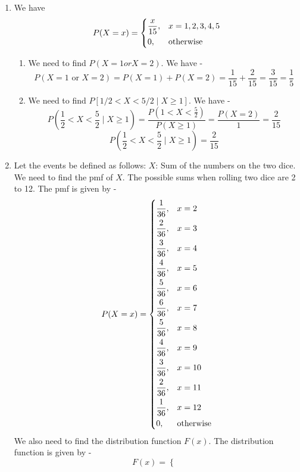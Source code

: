 \begin{enumerate}
\begin{enumerate}
\[\begin{cases}
            \end{cases}
            \]
            where $k = \frac{-4 + \sqrt{26}}{10}$.
    \end{enumerate}
    \item We have $$P(X = x) = \begin{dcases}
        \frac{x}{15}, & x = 1, 2, 3, 4, 5 \\
        0, & \text{otherwise}
    \end{dcases}
    $$
    \begin{enumerate}
        \item We need to find $P(X = 1 or X=2)$. We have -
        \[\boxed{P(X = 1 \text{ or } X=2) = P(X=1) + P(X=2) = \frac{1}{15} + \frac{2}{15} = \frac{3}{15} = \frac{1}{5}
        }\]
        \item We need to find $P[1/2 < X < 5/2 \mid X \geq 1]$. We have -
        \[P\left(\frac{1}{2} < X < \frac{5}{2} \mid X \geq 1\right) = \frac{P\left(1 < X < \frac{5}{2}\right)}{P(X \geq 1)} = \frac{P(X=2)}{1} = \frac{2}{15}\]
        \[\boxed{P\left(\frac{1}{2} < X < \frac{5}{2} \mid X \geq 1\right) = \frac{2}{15}
        }\]
    \end{enumerate}
    \item Let the events be defined as follows:
    $X$: Sum of the numbers on the two dice. We need to find the pmf of $X$. The possible sums when rolling two dice are 2 to 12. The pmf is given by -
    $$P(X = x) = \begin{dcases}
        \frac{1}{36}, & x = 2 \\
        \frac{2}{36}, & x = 3 \\
        \frac{3}{36}, & x = 4 \\
        \frac{4}{36}, & x = 5 \\
        \frac{5}{36}, & x = 6 \\
        \frac{6}{36}, & x = 7 \\
        \frac{5}{36}, & x = 8 \\
        \frac{4}{36}, & x = 9 \\
        \frac{3}{36}, & x = 10 \\
        \frac{2}{36}, & x = 11 \\
        \frac{1}{36}, & x = 12 \\
        0, & \text{otherwise}
    \end{dcases}
    $$
    We also need to find the distribution function $F(x)$. The distribution function is given by -
    \[F(x) = 
    \begin{cases}

\end{cases}\]
\end{enumerate}
